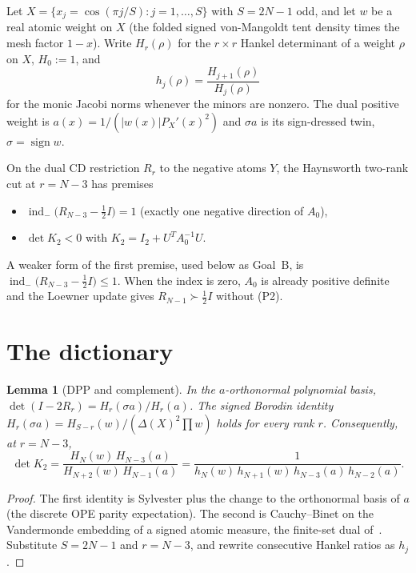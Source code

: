 \documentclass[11pt]{article}
\newtheorem{lemma}{Lemma}
\theoremstyle{remark}
\newcommand{\indm}{\operatorname{ind}_{-}}
\begin{document}
Let $X=\{x_j=\cos(\pi j/S):j=1,\ldots,S\}$ with $S=2N-1$ odd, and
let $w$ be a real atomic weight on $X$ (the folded signed
von-Mangoldt tent density times the mesh factor $1-x$).  Write
$H_r(\rho)$ for the $r\times r$ Hankel determinant of a weight
$\rho$ on $X$, $H_0:=1$, and
\[
h_j(\rho)=\frac{H_{j+1}(\rho)}{H_j(\rho)}
\]
for the monic Jacobi norms whenever the minors are nonzero.
The dual positive weight is $a(x)=1/(|w(x)|P_X'(x)^2)$ and
$\sigma a$ is its sign-dressed twin, $\sigma=\operatorname{sign} w$.

On the dual CD restriction $R_r$ to the negative atoms $Y$, the
Haynsworth two-rank cut at $r=N-3$ has premises
\begin{itemize}
\item[(P1)] $\indm\bigl(R_{N-3}-\tfrac12 I\bigr)=1$
  (exactly one negative direction of $A_0$),
\item[(P2)] $\det K_2<0$ with $K_2=I_2+U^T A_0^{-1}U$.
\end{itemize}
A weaker form of the first premise, used below as Goal~B, is
$\indm\bigl(R_{N-3}-\tfrac12 I\bigr)\le 1$.  When the index is
zero, $A_0$ is already positive definite and the Loewner update
gives $R_{N-1}\succ\tfrac12 I$ without (P2).

\section{The dictionary}\label{sec:dict}

\begin{lemma}[DPP and complement]\label{lem:dpp}
In the $a$-orthonormal polynomial basis,
$\det(I-2R_r)=H_r(\sigma a)/H_r(a)$.
The signed Borodin identity
$H_r(\sigma a)=H_{S-r}(w)/(\Delta(X)^2\prod w)$
holds for every rank $r$.  Consequently, at $r=N-3$,
\begin{equation}\label{eq:detk}
\det K_2
=\frac{H_N(w)\,H_{N-3}(a)}{H_{N+2}(w)\,H_{N-1}(a)}
=\frac1{h_N(w)\,h_{N+1}(w)\,h_{N-3}(a)\,h_{N-2}(a)}.
\end{equation}
\end{lemma}

\begin{proof}
The first identity is Sylvester plus the change to the
orthonormal basis of $a$ (the discrete OPE parity expectation).
The second is Cauchy--Binet on the Vandermonde embedding of a
signed atomic measure, the finite-set dual of~\cite{borodin}.
Substitute $S=2N-1$ and $r=N-3$, and rewrite consecutive Hankel
ratios as $h_j$.
\end{proof}
\end{document}
